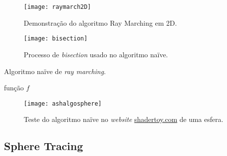 % 
% 
% 	
% 	
% 	

\begin{figure}[!htbp]
    \centering
    \texttt{[image: raymarch2D]}
    \caption[Demonstração do algoritmo Ray Marching em 2D]{Demonstração do algoritmo Ray Marching em 2D.}
    \label{fig::rmarching2D}
\end{figure}

\begin{figure}[!htbp]
    \centering
    \texttt{[image: bisection]}
    \caption[Processo de \textit{bisection} usado no algoritmo naïve]{Processo de \textit{bisection} usado no algoritmo naïve.}
    \label{fig::rmarching2DBisection}
\end{figure}

\begin{algorithm}[!htbp]
	\caption{Algoritmo naïve de \textit{ray marching}.}
	\label{alg::raymarch_naive}
	\begin{algorithmic}
\Require função $f$      
	\end{algorithmic}
\end{algorithm}

\begin{figure}[!htbp]
	\centering
	\texttt{[image: ashalgosphere]}
	\caption[Teste do algoritmo naïve]{Teste do algoritmo naïve no \textit{website} \url{shadertoy.com} de uma esfera.}
	\label{fig::ashalgosphere}
\end{figure}


\subsection{Sphere Tracing}
\label{ssec::arte:raymarch:spheretracing}

